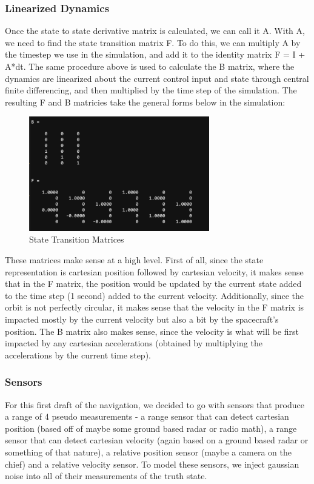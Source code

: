 \subsubsection{Linearized Dynamics}
Once the state to state derivative matrix is calculated, we can call it A. With A, we need to find the state transition matrix F. To do this, we can multiply A by the timestep we use in the simulation, and add it to the identity matrix F = I + A*dt. The same procedure above is used to calculate the B matrix, where the dynamics are linearized about the current control input and state through central finite differencing, and then multiplied by the time step of the simulation. The resulting F and B matricies take the general forms below in the simulation:

\begin{figure}[H]
    \centering
    \includegraphics[width=0.7\textwidth]{PS7/Figures/Screenshot 2025-05-19 221625.png}
    \caption{State Transition Matrices}
    \label{fig:State Transition Matrices}
\end{figure}

These matrices make sense at a high level. First of all, since the state representation is cartesian position followed by cartesian velocity, it makes sense that in the F matrix, the position would be updated by the current state added to the time step (1 second) added to the current velocity. Additionally, since the orbit is not perfectly circular, it makes sense that the velocity in the F matrix is impacted mostly by the current velocity but also a bit by the spacecraft's position. The B matrix also makes sense, since the velocity is what will be first impacted by any cartesian accelerations (obtained by multiplying the accelerations by the current time step).

\subsubsection{Sensors}
For this first draft of the navigation, we decided to go with sensors that produce a range of 4 pseudo measurements - a range sensor that can detect cartesian position (based off of maybe some ground based radar or radio math), a range sensor that can detect cartesian velocity (again based on a ground based radar or something of that nature), a relative position sensor (maybe a camera on the chief) and a relative velocity sensor. To model these sensors, we inject gaussian noise into all of their measurements of the truth state.

